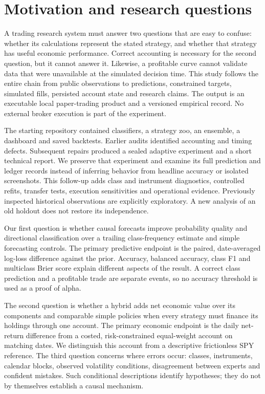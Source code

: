 \documentclass[11pt,a4paper]{article}
\begin{document}
\section{Motivation and research questions}\label{sec:section-01}

A trading research system must answer two questions that are easy to confuse: whether its calculations represent the stated strategy, and whether that strategy has useful economic performance. Correct accounting is necessary for the second question, but it cannot answer it. Likewise, a profitable curve cannot validate data that were unavailable at the simulated decision time. This study follows the entire chain from public observations to predictions, constrained targets, simulated fills, persisted account state and research claims. The output is an executable local paper-trading product and a versioned empirical record. No external broker execution is part of the experiment.

The starting repository contained classifiers, a strategy zoo, an ensemble, a dashboard and saved backtests. Earlier audits identified accounting and timing defects. Subsequent repairs produced a sealed adaptive experiment and a short technical report. We preserve that experiment and examine its full prediction and ledger records instead of inferring behavior from headline accuracy or isolated screenshots. This follow-up adds class and instrument diagnostics, controlled refits, transfer tests, execution sensitivities and operational evidence. Previously inspected historical observations are explicitly exploratory. A new analysis of an old holdout does not restore its independence.

Our first question is whether causal forecasts improve probability quality and directional classification over a trailing class-frequency estimate and simple forecasting controls. The primary predictive endpoint is the paired, date-averaged log-loss difference against the prior. Accuracy, balanced accuracy, class F1 and multiclass Brier score explain different aspects of the result. A correct class prediction and a profitable trade are separate events, so no accuracy threshold is used as a proof of alpha.

The second question is whether a hybrid adds net economic value over its components and comparable simple policies when every strategy must finance its holdings through one account. The primary economic endpoint is the daily net-return difference from a costed, risk-constrained equal-weight account on matching dates. We distinguish this account from a descriptive frictionless SPY reference. The third question concerns where errors occur: classes, instruments, calendar blocks, observed volatility conditions, disagreement between experts and confident mistakes. Such conditional descriptions identify hypotheses; they do not by themselves establish a causal mechanism.
\end{document}

